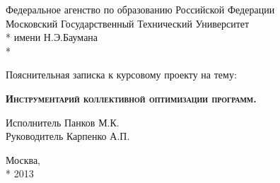 \begin{titlepage}
    \newpage
    
    \begin{center}
        Федеральное агенство по образованию Российской Федерации \\
        Московский Государственный Технический Университет \\*
        имени Н.Э.Баумана \\*
        \vspace{-12mm}
        \begin{figure}[h]
        \end{figure}
        \vspace{-16mm}
        \hrulefill
    \end{center}
    \begin{center}
        \Large Пояснительная записка к курсовому проекту на тему:
    \end{center}
    
    \vspace{2.5em}
    
    \begin{center}
        \textsc{\textbf{Инструментарий коллективной оптимизации программ.}}
    \end{center}
    
    \vspace{6em}
    
    \begin{flushleft}
        \hspace{8.5cm}Исполнитель \hrulefill Панков М.К. \\
        \vspace{1.5em}
        \hspace{8.5cm}Руководитель \hrulefill Карпенко А.П.\\
    \end{flushleft}
    
    \vspace{\fill}
    
    \begin{center}
        Москва, \\*
        2013
    \end{center}

\end{titlepage}